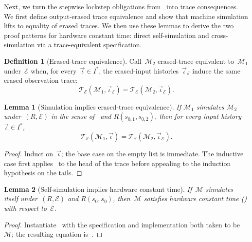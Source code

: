 \documentclass[fontset=fira-newtxsf]{mitthesis}
\theoremstyle{definition}
\newtheorem{definition}{Definition}[section]
\theoremstyle{plain}
\newtheorem{lemma}{Lemma}[section]
\begin{document}
Next, we turn the stepwise lockstep obligations from~ into trace consequences. We first define output-erased trace equivalence and show that machine simulation lifts to equality of erased traces. We then use these lemmas to derive the two proof patterns for hardware constant time: direct self-simulation and cross-simulation via a trace-equivalent specification.

\begin{definition}[Erased-trace equivalence] \label{def:outputs-erased-bridge}
Call~\(\mathcal M_2\) erased-trace equivalent to~\(\mathcal M_1\) under~\(\mathcal E\) when, for every~\(\vec\iota\in I^*\), the erased-input histories~\(\vec\iota_{\mathcal E}\) induce the same erased observation trace:
\[
  \mathcal{T}_{\mathcal E}(\mathcal M_1,\vec\iota_{\mathcal E})
  =
  \mathcal{T}_{\mathcal E}(\mathcal M_2,\vec\iota_{\mathcal E}).
\]
\end{definition}

\begin{lemma}[Simulation implies erased-trace equivalence]
\label{lem:sim-lift-erased-traces}
If \(\mathcal{M}_1\) simulates \(\mathcal{M}_2\) under~\((R, \mathcal E)\) in the sense of~ and \(R(s_{0,1},s_{0,2})\), then for every input history~\(\vec\iota\in I^*\),
\[
  \mathcal{T}_{\mathcal E}(\mathcal M_1,\vec\iota)
  =
  \mathcal{T}_{\mathcal E}(\mathcal M_2,\vec\iota_{\mathcal E}).
\]
\end{lemma}

\begin{proof}[Proof]
Induct on~\(\vec\iota\); the base case on the empty list is immediate. The inductive case first applies~ to the head of the trace before appealing to the induction hypothesis on the tails.
\end{proof}

\begin{lemma}[Self-simulation implies hardware constant time]
\label{lem:self-sim-hct}
If~\(\mathcal M\) simulates itself under~\((R,\mathcal E)\) and \(R(s_0,s_0)\), then~\(\mathcal M\) satisfies hardware constant time () with respect to~\(\mathcal E\).
\end{lemma}

\begin{proof}[Proof]
Instantiate~ with the specification and implementation both taken to be~\(\mathcal M\); the resulting equation is~.
\end{proof}
\end{document}
